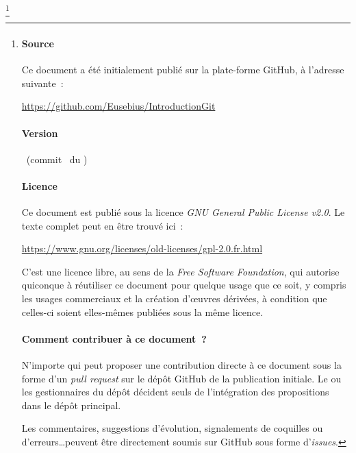 \documentclass[a4paper,twoside,french]{book}
\begin{document}
\thanks{

  \par\vspace*{\fill}

  \paragraph*{Source}

  Ce document a été initialement publié sur la plate-forme GitHub, à
  l'adresse suivante~:\\
  \centerline{\url{https://github.com/Eusebius/IntroductionGit}}

  \paragraph*{Version}

  \currentVersion\
  (commit \gitAbbrevHash\ du \gitCommitterDate)
  
  \paragraph*{Licence}

  Ce document est publié sous la licence \textit{GNU General Public
    License v2.0}. Le texte complet peut en être trouvé ici~:\\
  \centerline{\url{https://www.gnu.org/licenses/old-licenses/gpl-2.0.fr.html}}

  C'est une licence libre, au sens de la \textit{Free Software
    Foundation}, qui autorise quiconque à réutiliser ce document pour
  quelque usage que ce soit, y compris les usages commerciaux et la
  création d'\oe uvres dérivées, à condition que celles-ci soient
  elles-mêmes publiées sous la même licence.

  \paragraph*{Comment contribuer à ce document~?}

  N'importe qui peut proposer une contribution directe à ce document
  sous la forme d'un \textit{pull request} sur le dépôt GitHub de la
  publication initiale. Le ou les gestionnaires du dépôt décident
  seuls de l'intégration des propositions dans le dépôt principal.

  Les commentaires, suggestions d'évolution, signalements de coquilles
  ou d'erreurs\ldots peuvent être directement soumis sur GitHub sous
  forme d'\textit{issues}.

}
\end{document}
